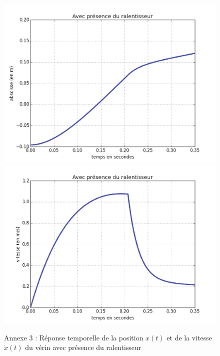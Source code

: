 \begin{figure}[ht!]
\begin{center}
 \includegraphics[width=0.85\linewidth]{img/a31}\\
 \includegraphics[width=0.85\linewidth]{img/a32}
\end{center}
\caption{Annexe 3 : Réponse temporelle de la position $x(t)$ et de la vitesse $\dot{x}(t)$ du vérin avec présence du ralentisseur}
\label{a3}
\end{figure}

\newpage

\ifdef{\public}{\pagestyle{docreponse}}{\pagestyle{correction}}

\newpage


